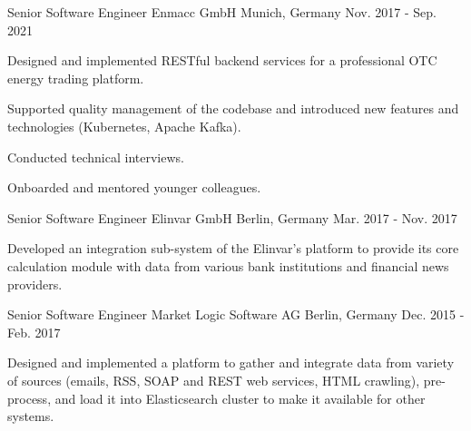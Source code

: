 \begin{cventries}
    \cventry
    {Senior Software Engineer} %
    {Enmacc GmbH} %
    {Munich, Germany} %
    {Nov. 2017 - Sep. 2021} %
    {
        \begin{cvitems} %
            \item {Designed and implemented RESTful backend services for a professional OTC energy trading platform.}
            \item {Supported quality management of the codebase and introduced new features and technologies (Kubernetes, Apache Kafka).}
            \item {Conducted technical interviews.}
            \item {Onboarded and mentored younger colleagues.}
        \end{cvitems}
    }

    \cventry
    {Senior Software Engineer} %
    {Elinvar GmbH} %
    {Berlin, Germany} %
    {Mar. 2017 - Nov. 2017} %
    {
        \begin{cvitems} %
            \item {Developed an integration sub-system of the Elinvar's platform to provide its core calculation module with data from various bank institutions and financial news providers.}
        \end{cvitems}
    }

    \cventry
    {Senior Software Engineer} %
    {Market Logic Software AG} %
    {Berlin, Germany} %
    {Dec. 2015 - Feb. 2017} %
    {
        \begin{cvitems} %
            \item {Designed and implemented a platform to gather and integrate data from variety of sources (emails, RSS, SOAP and REST web services, HTML crawling), pre-process, and load it into Elasticsearch cluster to make it available for other systems.}
        \end{cvitems}
    }


\end{cventries}
